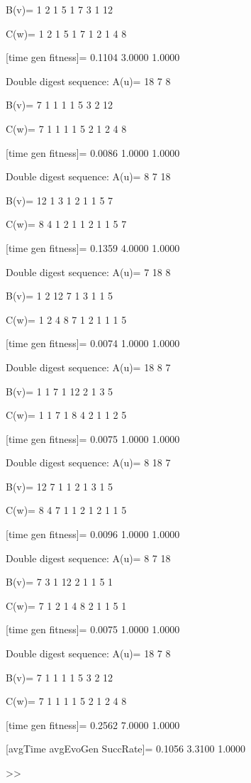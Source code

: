 B(v)=
     1     2     1     5     1     7     3     1    12

C(w)=
     1     2     1     5     1     7     1     2     1     4     8

[time gen fitness]=
    0.1104    3.0000    1.0000

Double digest sequence:
A(u)=
    18     7     8

B(v)=
     7     1     1     1     1     5     3     2    12

C(w)=
     7     1     1     1     1     5     2     1     2     4     8

[time gen fitness]=
    0.0086    1.0000    1.0000

Double digest sequence:
A(u)=
     8     7    18

B(v)=
    12     1     3     1     2     1     1     5     7

C(w)=
     8     4     1     2     1     1     2     1     1     5     7

[time gen fitness]=
    0.1359    4.0000    1.0000

Double digest sequence:
A(u)=
     7    18     8

B(v)=
     1     2    12     7     1     3     1     1     5

C(w)=
     1     2     4     8     7     1     2     1     1     1     5

[time gen fitness]=
    0.0074    1.0000    1.0000

Double digest sequence:
A(u)=
    18     8     7

B(v)=
     1     1     7     1    12     2     1     3     5

C(w)=
     1     1     7     1     8     4     2     1     1     2     5

[time gen fitness]=
    0.0075    1.0000    1.0000

Double digest sequence:
A(u)=
     8    18     7

B(v)=
    12     7     1     1     2     1     3     1     5

C(w)=
     8     4     7     1     1     2     1     2     1     1     5

[time gen fitness]=
    0.0096    1.0000    1.0000

Double digest sequence:
A(u)=
     8     7    18

B(v)=
     7     3     1    12     2     1     1     5     1

C(w)=
     7     1     2     1     4     8     2     1     1     5     1

[time gen fitness]=
    0.0075    1.0000    1.0000

Double digest sequence:
A(u)=
    18     7     8

B(v)=
     7     1     1     1     1     5     3     2    12

C(w)=
     7     1     1     1     1     5     2     1     2     4     8

[time gen fitness]=
    0.2562    7.0000    1.0000

[avgTime  avgEvoGen  SuccRate]=
    0.1056    3.3100    1.0000

>> 